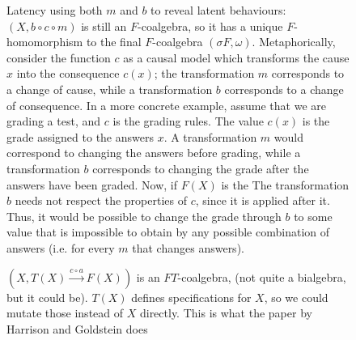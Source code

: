 \begin{figure}
    \centering
    \caption{Latency using both $m$ and $b$ to reveal latent behaviours: $(X,b\circ c\circ m)$ is still an $F$-coalgebra, so it has a unique $F$-homomorphism to the final $F$-coalgebra $(\sigma F, \omega)$. Metaphorically, consider the function $c$ as a causal model which transforms the cause $x$ into the consequence $c(x)$; the transformation $m$ corresponds to a change of cause, while a transformation $b$ corresponds to a change of consequence. In a more concrete example, assume that we are grading a test, and $c$ is the grading rules. The value $c(x)$ is the grade assigned to the answers $x$. A transformation $m$ would correspond to changing the answers before grading, while a transformation $b$ corresponds to changing the grade after the answers have been graded. Now, if $F(X)$ is the The transformation $b$ needs not respect the properties of $c$, since it is applied after it. Thus, it would be possible to change the grade through $b$ to some value that is impossible to obtain by any possible combination of answers (i.e. for every $m$ that changes answers).}
\end{figure}
\begin{figure}
    \centering
    \caption{$(X,T(X)\xrightarrow{c\circ a}F(X))$ is an $FT$-coalgebra, (not quite a bialgebra, but it could be). $T(X)$ defines specifications for $X$, so we could mutate those instead of $X$ directly. This is what the paper by Harrison and Goldstein does \cite{DoJudgeATestByItsCover}}
\end{figure}

